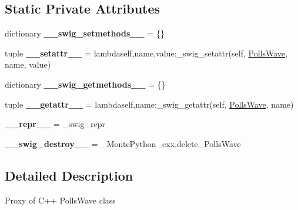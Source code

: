 \subsection*{Static Private Attributes}
\begin{DoxyCompactItemize}
\item 
\hypertarget{classMontePython__cxx_1_1PollsWave_a756a6dd9e7cbdc4519b1ab4a52a7fa39}{}dictionary {\bfseries \+\_\+\+\_\+swig\+\_\+setmethods\+\_\+\+\_\+} = \{\}\label{classMontePython__cxx_1_1PollsWave_a756a6dd9e7cbdc4519b1ab4a52a7fa39}

\item 
\hypertarget{classMontePython__cxx_1_1PollsWave_a2e0f16c957c611e48948bf3fdbcc76d0}{}tuple {\bfseries \+\_\+\+\_\+setattr\+\_\+\+\_\+} = lambdaself,name,value\+:\+\_\+swig\+\_\+setattr(self, \hyperlink{classMontePython__cxx_1_1PollsWave}{Polls\+Wave}, name, value)\label{classMontePython__cxx_1_1PollsWave_a2e0f16c957c611e48948bf3fdbcc76d0}

\item 
\hypertarget{classMontePython__cxx_1_1PollsWave_a33b058407589ce8798c2d3f07e409b59}{}dictionary {\bfseries \+\_\+\+\_\+swig\+\_\+getmethods\+\_\+\+\_\+} = \{\}\label{classMontePython__cxx_1_1PollsWave_a33b058407589ce8798c2d3f07e409b59}

\item 
\hypertarget{classMontePython__cxx_1_1PollsWave_a866094d2cc0782c54ed0a6d445dbaa86}{}tuple {\bfseries \+\_\+\+\_\+getattr\+\_\+\+\_\+} = lambdaself,name\+:\+\_\+swig\+\_\+getattr(self, \hyperlink{classMontePython__cxx_1_1PollsWave}{Polls\+Wave}, name)\label{classMontePython__cxx_1_1PollsWave_a866094d2cc0782c54ed0a6d445dbaa86}

\item 
\hypertarget{classMontePython__cxx_1_1PollsWave_a2ed7ebde022f309b5e216f0e496b2d47}{}{\bfseries \+\_\+\+\_\+repr\+\_\+\+\_\+} = \+\_\+swig\+\_\+repr\label{classMontePython__cxx_1_1PollsWave_a2ed7ebde022f309b5e216f0e496b2d47}

\item 
\hypertarget{classMontePython__cxx_1_1PollsWave_ac874a88a83f4769c9ed0c9228285cf09}{}{\bfseries \+\_\+\+\_\+swig\+\_\+destroy\+\_\+\+\_\+} = \+\_\+\+Monte\+Python\+\_\+cxx.\+delete\+\_\+\+Polls\+Wave\label{classMontePython__cxx_1_1PollsWave_ac874a88a83f4769c9ed0c9228285cf09}

\end{DoxyCompactItemize}


\subsection{Detailed Description}
\begin{DoxyVerb}Proxy of C++ PollsWave class\end{DoxyVerb}
 

